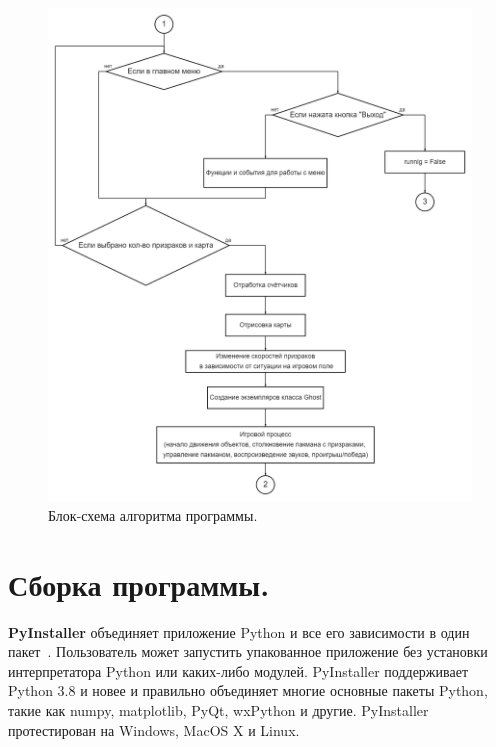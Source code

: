 \begin{figure}[H]
	\centering
	\includegraphics[width=1\linewidth]{images/flow2.png}
	\caption{Блок-схема алгоритма программы.}
	\label{fig8}
\end{figure}

\section{\label{sec:ch02/sec01/sub09}Сборка программы.}
\textbf{PyInstaller} объединяет приложение Python и все его зависимости в один пакет~\cite{pyinstEN}. Пользователь может запустить упакованное приложение без установки интерпретатора Python или каких-либо модулей. PyInstaller поддерживает Python 3.8 и новее и правильно объединяет многие основные пакеты Python, такие как numpy, matplotlib, PyQt, wxPython и другие. PyInstaller протестирован на Windows, MacOS X и Linux.

